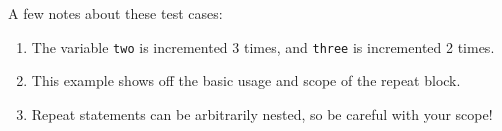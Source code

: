 A few notes about these test cases:

\begin{enumerate}
    \item The variable \texttt{two} is incremented 3 times, and \texttt{three} is incremented 2 times.
    \item This example shows off the basic usage and scope of the repeat block.
    \item Repeat statements can be arbitrarily nested, so be careful with your scope!
\end{enumerate}